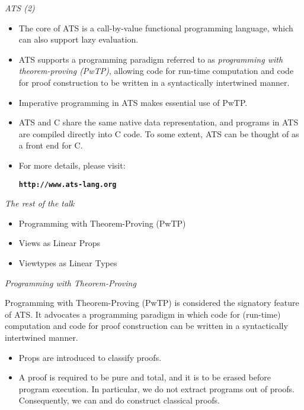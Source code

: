 \documentclass[pdf]{prosper}
\begin{document}
\begin{slide}{\em ATS (2)}
\begin{itemize}
\item
The core of ATS is a call-by-value functional programming language,
which can also support lazy evaluation.
\item
ATS supports a programming paradigm referred to as {\em programming with
theorem-proving (PwTP)}, allowing code for run-time computation and
code for proof construction to be written in a syntactically intertwined
manner.
\item
Imperative programming in ATS makes essential use of PwTP.
\item
ATS and C share the same native data representation, and
programs in ATS are compiled directly into C code. To some extent, ATS
can be thought of as a front end for C.
\item
For more details, please visit:
\begin{center}
\texttt{\bf http://www.ats-lang.org}
\end{center}
\end{itemize}
\end{slide}
\begin{slide}{\em The rest of the talk}
\begin{itemize}
\item Programming with Theorem-Proving (PwTP)
\item Views as Linear Props
\item Viewtypes as Linear Types
\end{itemize}
\end{slide}
\begin{slide}{\em Programming with Theorem-Proving}

Programming with Theorem-Proving (PwTP) is considered the signatory
feature of ATS. It advocates a programming paradigm in which code for
(run-time) computation and code for proof construction can be written in a
syntactically intertwined manner.

\begin{itemize}
\item
Props are introduced to classify proofs.
\item
A proof is required to be pure and total, and it is to be erased before
program execution. In particular, we do not extract programs out of
proofs. Consequently, we can and do construct classical proofs.
\end{itemize}
\end{slide}
\end{document}
